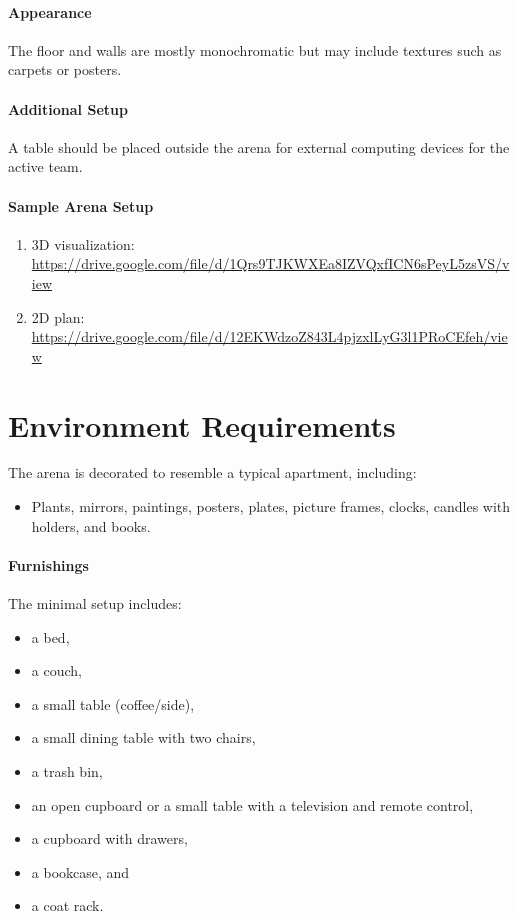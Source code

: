 \paragraph{Appearance} The floor and walls are mostly monochromatic but may include textures such as carpets or posters.

\paragraph{Additional Setup} A table should be placed outside the arena for external computing devices for the active team.

\paragraph{Sample Arena Setup} 
\begin{enumerate}
    \item 3D visualization: \url{https://drive.google.com/file/d/1Qrs9TJKWXEa8IZVQxfICN6sPeyL5zsVS/view}
    \item 2D plan: \url{https://drive.google.com/file/d/12EKWdzoZ843L4pjzxlLyG3l1PRoCEfeh/view}
\end{enumerate}

\section{Environment Requirements}
The arena is decorated to resemble a typical apartment, including:
\begin{itemize}
    \item Plants, mirrors, paintings, posters, plates, picture frames, clocks, candles with holders, and books.
\end{itemize}

\paragraph{Furnishings} The minimal setup includes:
\begin{itemize}
    \item a bed,
    \item a couch,
    \item a small table (coffee/side),
    \item a small dining table with two chairs,
    \item a trash bin,
    \item an open cupboard or a small table with a television and remote control,
    \item a cupboard with drawers,
    \item a bookcase, and
    \item a coat rack.
\end{itemize}

